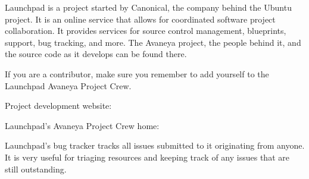 

Launchpad is a project started by Canonical, the company behind the Ubuntu project. It is an online service that allows for coordinated software project collaboration. It provides services for source control management, blueprints, support, bug tracking, and more. The Avaneya project, the people behind it, and the source code as it develops can be found there.

If you are a contributor, make sure you remember to add yourself to the Launchpad Avaneya Project Crew.

Project development website:\crlf
{}

Launchpad's Avaneya Project Crew home:\crlf
{}

Launchpad's bug tracker tracks all issues submitted to it originating from anyone. It is very useful for triaging resources and keeping track of any issues that are still outstanding.


